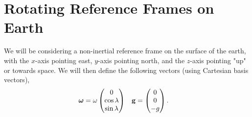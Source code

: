 \documentclass{book}
\begin{document}
\chapter{Rotating Reference Frames on Earth}
\noindent We will be considering a non-inertial reference frame on the surface of the earth, with the $x$-axis pointing east, $y$-axis pointing north, and the $z$-axis pointing "up" or towards space. We will then define the following vectors (using Cartesian basis vectors), 
\begin{align}
    \vb*{\omega} &= \omega\begin{pmatrix}
        0 \\
        \cos\lambda \\
        \sin\lambda
    \end{pmatrix} 
    &
    \vb{g} &= \begin{pmatrix}
        0 \\
        0 \\
        -g
    \end{pmatrix}.
\end{align}
\end{document}
